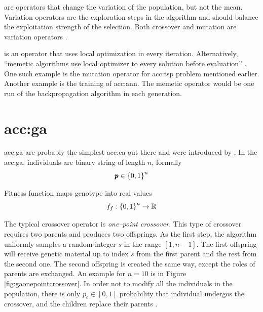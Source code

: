  are operators that change the variation of the population, but not the mean. Variation operators are the exploration steps in the algorithm and should balance the exploitation strength of the selection. Both crossover and mutation are variation operators \citep{SelfAdaptiveFeaturesInRealParameterEvolutionaryAlgorithms}.

 is an operator that uses local optimization in every iteration. Alternatively, \enquote{memetic algorithms use local optimizer to every solution before evaluation} \citep{HowToSolveItModernHeuristics}. One such example is the mutation operator for \acrlong{acc:tsp} problem mentioned earlier. Another example is the training of \acrshort{acc:ann}. The memetic operator would be one run of the backpropagation algorithm in each generation.




\section{\texorpdfstring{\acrlong*{acc:ga}}{Genetic Algorithms}}

\acrfull{acc:ga} are probably the simplest \acrfull{acc:ea} out there and were introduced by \citet{HollandGA}. In the \acrshort{acc:ga}, individuals are binary string of length $n$, formally
$$ \pmb{p} \in \left\{0,1\right\}^{n} $$

Fitness function maps genotype into real values
$$ f_f:\left\{0,1\right\}^{n}\rightarrow\mathbb{R} $$

The typical crossover operator is \emph{one--point crossover}. This type of crossover requires two parents and produces two offsprings. As the first step, the algorithm uniformly samples a random integer $s$ in the range $\left[ 1, n-1 \right]$. The first offspring will receive genetic material up to index $s$ from the first parent and the rest from the second one. The second offspring is created the same way, except the roles of parents are exchanged. An example for $n=10$ is in Figure \ref{fig:gaonepointcrossover}. In order not to modify all the individuals in the population, there is only $p_c\in\left[0,1\right]$ probability that individual undergos the crossover, and the children replace their parents \citep{IntroductionToEA}.

